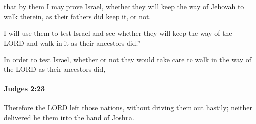 			\begin{versebox}
					\item[BHS] 
					\item[ASV] that by them I may prove Israel, whether they will keep the way of Jehovah to walk therein, as their fathers did keep it, or not.
					\item[NIV] I will use them to test Israel and see whether they will keep the way of the LORD and walk in it as their ancestors did.”
					\item[NRSV] In order to test Israel, whether or not they would take care to walk in the way of the LORD as their ancestors did,
			\end{versebox}

		\paragraph{Judges 2:23} %
			\label{JUDGES-2-23}

			Therefore the LORD left those nations, without driving them out hastily; neither delivered he them into the hand of Joshua.

